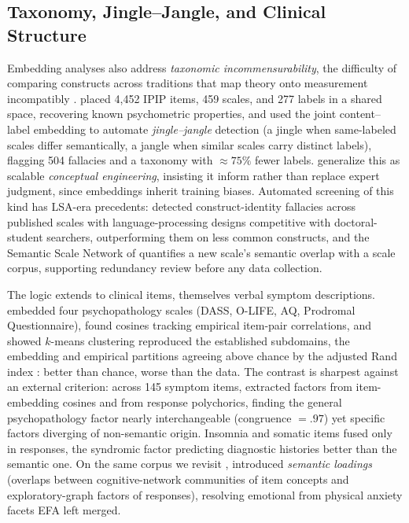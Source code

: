 \subsection{Taxonomy, Jingle--Jangle, and Clinical Structure}

Embedding analyses also address \emph{taxonomic incommensurability}, the difficulty
of comparing constructs across traditions that map theory onto measurement
incompatibly \citep{wulff-mata-2025}. \citet{wulff-mata-2025} placed 4,452 IPIP
items, 459 scales, and 277 labels in a shared space, recovering known psychometric
properties, and used the joint content--label embedding to automate
\emph{jingle--jangle} detection (a jingle when same-labeled scales differ
semantically, a jangle when similar scales carry distinct labels), flagging 504
fallacies and a taxonomy with $\approx75\%$ fewer labels.
\citet{wulff-mata-2026} generalize this as scalable \emph{conceptual
engineering}, insisting it inform rather than replace expert judgment, since
embeddings inherit training biases. Automated screening of this kind has
LSA-era precedents: \citet{larsen-bong-2016} detected construct-identity
fallacies across published scales with language-processing designs
competitive with doctoral-student searchers, outperforming them on less
common constructs, and the Semantic Scale Network of
\citet{rosenbusch-etal-2020} quantifies a new scale's semantic overlap with a
scale corpus, supporting redundancy review before any data collection.

The logic extends to clinical items, themselves verbal symptom descriptions.
\citet{kambeitz-etal-2025} embedded four psychopathology scales (DASS, O-LIFE, AQ,
Prodromal Questionnaire), found cosines tracking empirical item-pair correlations,
and showed $k$-means clustering reproduced the established subdomains, the embedding
and empirical partitions agreeing above chance by the adjusted Rand index
\citep{hubert-arabie-1985}: better than chance, worse than the data. The contrast is sharpest against an external criterion: across 145 symptom
items, \citet{kojima-etal-2026} extracted factors from item-embedding cosines and
from
response polychorics, finding the general psychopathology factor nearly
interchangeable (congruence $=.97$) yet specific factors diverging of non-semantic
origin. Insomnia and somatic items fused only in responses, the syndromic factor
predicting diagnostic histories better than the semantic one. On the same corpus we
revisit \citep{openpsychometrics-2018}, \citet{stanghellini-etal-2024} introduced
\emph{semantic loadings} (overlaps between cognitive-network communities of item
concepts and exploratory-graph factors of responses), resolving emotional from
physical anxiety facets EFA left merged.

